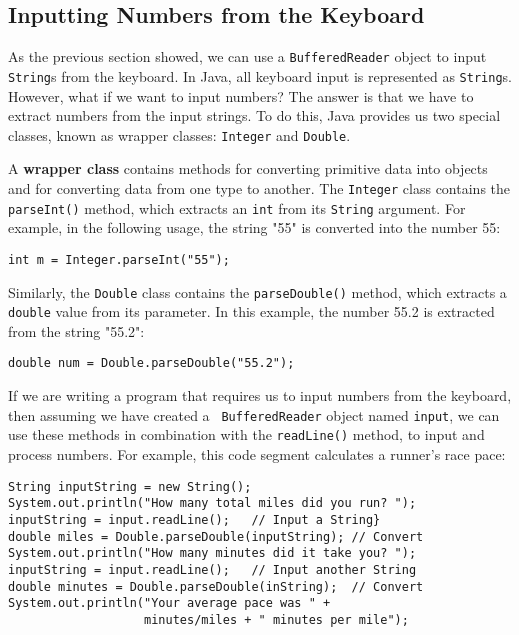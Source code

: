 
\subsection{Inputting Numbers from the Keyboard}

As the previous section showed, we can use a {\tt BufferedReader}
object to input {\tt String}s from the keyboard. In Java, all keyboard
input is represented as {\tt String}s. However, what if we want to
input numbers?  The answer is that we have to extract numbers from the
input strings.  To do this, Java provides us two special classes,
known as wrapper classes: {\tt Integer} and {\tt Double}.

A {\bf wrapper class} contains methods for converting primitive
data into objects and for converting data from one type to another.
The {\tt Integer} class contains the {\tt parseInt()}
method, which extracts an {\tt int} from its {\tt String} argument.
For example, in the following usage, the string "55" is converted
into the number 55:

\begin{jjjlisting}
\begin{lstlisting}
int m = Integer.parseInt("55");
\end{lstlisting}
\end{jjjlisting}

\noindent Similarly, the {\tt Double} class contains the
{\tt parseDouble()} method, which extracts a {\tt double} value from
its parameter. In this example, the number 55.2 is extracted from the
string "55.2":

\begin{jjjlisting}
\begin{lstlisting}
double num = Double.parseDouble("55.2");
\end{lstlisting}
\end{jjjlisting}

\noindent If we are writing a program that requires us to input numbers 
from the keyboard, then assuming we have created a {\tt
BufferedReader} object named {\tt input}, we can use these methods in
combination with the {\tt readLine()} method, to input and process
numbers. For example, this code segment calculates a runner's race
pace:

\begin{jjjlisting}
\begin{lstlisting}
String inputString = new String();  
System.out.println("How many total miles did you run? ");  
inputString = input.readLine();   // Input a String}
double miles = Double.parseDouble(inputString); // Convert
System.out.println("How many minutes did it take you? ");  
inputString = input.readLine();   // Input another String
double minutes = Double.parseDouble(inString);  // Convert
System.out.println("Your average pace was " + 
                   minutes/miles + " minutes per mile");
\end{lstlisting}
\end{jjjlisting}

